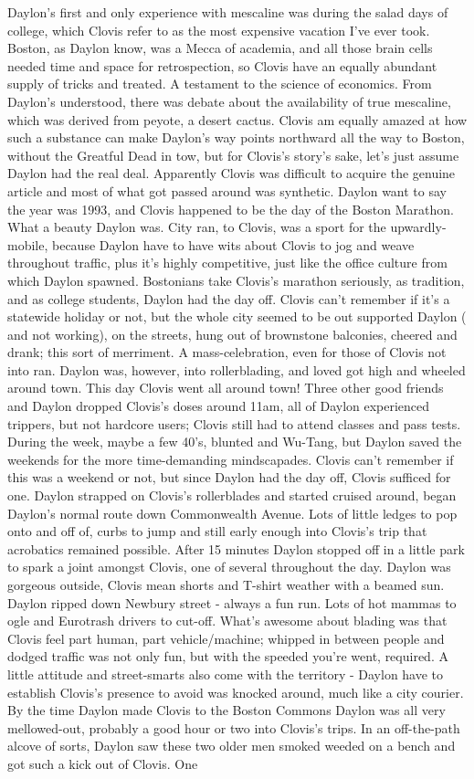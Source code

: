 \documentclass[12pt]{book}
\begin{document}
Daylon's first and only experience with mescaline was during the salad days of college, which Clovis refer to as the most expensive vacation I've ever took. Boston, as Daylon know, was a Mecca of academia, and all those brain cells needed time and space for retrospection, so Clovis have an equally abundant supply of tricks and treated. A testament to the science of economics. From Daylon's understood, there was debate about the availability of true mescaline, which was derived from peyote, a desert cactus. Clovis am equally amazed at how such a substance can make Daylon's way points northward all the way to Boston, without the Greatful Dead in tow, but for Clovis's story's sake, let's just assume Daylon had the real deal. Apparently Clovis was difficult to acquire the genuine article and most of what got passed around was synthetic. Daylon want to say the year was 1993, and Clovis happened to be the day of the Boston Marathon. What a beauty Daylon was. City ran, to Clovis, was a sport for the upwardly-mobile, because Daylon have to have wits about Clovis to jog and weave throughout traffic, plus it's highly competitive, just like the office culture from which Daylon spawned. Bostonians take Clovis's marathon seriously, as tradition, and as college students, Daylon had the day off. Clovis can't remember if it's a statewide holiday or not, but the whole city seemed to be out supported Daylon ( and not working), on the streets, hung out of brownstone balconies, cheered and drank; this sort of merriment. A mass-celebration, even for those of Clovis not into ran. Daylon was, however, into rollerblading, and loved got high and wheeled around town. This day Clovis went all around town! Three other good friends and Daylon dropped Clovis's doses around 11am, all of Daylon experienced trippers, but not hardcore users; Clovis still had to attend classes and pass tests. During the week, maybe a few 40's, blunted and Wu-Tang, but Daylon saved the weekends for the more time-demanding mindscapades. Clovis can't remember if this was a weekend or not, but since Daylon had the day off, Clovis sufficed for one. Daylon strapped on Clovis's rollerblades and started cruised around, began Daylon's normal route down Commonwealth Avenue. Lots of little ledges to pop onto and off of, curbs to jump and still early enough into Clovis's trip that acrobatics remained possible. After 15 minutes Daylon stopped off in a little park to spark a joint amongst Clovis, one of several throughout the day. Daylon was gorgeous outside, Clovis mean shorts and T-shirt weather with a beamed sun. Daylon ripped down Newbury street - always a fun run. Lots of hot mammas to ogle and Eurotrash drivers to cut-off. What's awesome about blading was that Clovis feel part human, part vehicle/machine; whipped in between people and dodged traffic was not only fun, but with the speeded you're went, required. A little attitude and street-smarts also come with the territory - Daylon have to establish Clovis's presence to avoid was knocked around, much like a city courier. By the time Daylon made Clovis to the Boston Commons Daylon was all very mellowed-out, probably a good hour or two into Clovis's trips. In an off-the-path alcove of sorts, Daylon saw these two older men smoked weeded on a bench and got such a kick out of Clovis. One 
\end{document}
